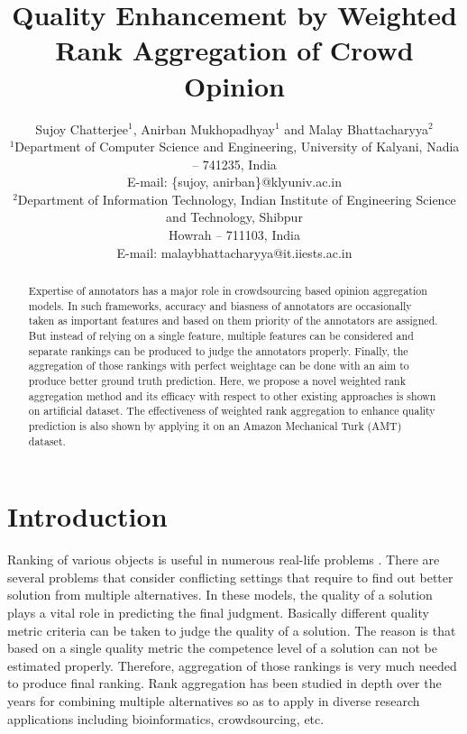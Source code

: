 \documentclass[letterpaper]{article}
\begin{document}
\title{Quality Enhancement by Weighted Rank Aggregation of Crowd Opinion}
\author{Sujoy Chatterjee$^1$, Anirban Mukhopadhyay$^1$ and Malay Bhattacharyya$^2$\\
$^1$Department of Computer Science and Engineering, University of Kalyani, Nadia -- 741235, India\\
E-mail: \{sujoy, anirban\}@klyuniv.ac.in\\
$^2$Department of Information Technology, Indian Institute of Engineering Science and Technology, Shibpur\\ Howrah -- 711103, India\\
E-mail: malaybhattacharyya@it.iiests.ac.in\\
}
\maketitle




\begin{abstract}
Expertise of annotators has a major role in crowdsourcing based opinion aggregation models. In such frameworks, accuracy and biasness of annotators are occasionally taken as important features and based on them priority of the annotators are assigned. But instead of relying on a single feature, multiple features can be considered and separate rankings can be produced to judge the annotators properly. Finally, the aggregation of those rankings with perfect weightage can be done with an aim to produce better ground truth prediction. Here, we propose a novel weighted rank aggregation method and its efficacy with respect to other existing approaches is shown on artificial dataset. The effectiveness of weighted rank aggregation to enhance quality prediction is also shown by applying it on an Amazon Mechanical Turk (AMT) dataset.
\end{abstract}




\section{Introduction}
Ranking of various objects is useful in numerous real-life problems \cite{Dwork2001,DeConde2006}. There are several problems that consider conflicting settings that require to find out better solution from multiple alternatives. In these models, the quality of a solution plays a vital role in predicting the final judgment. Basically different quality metric criteria can be taken to judge the quality of a solution. The reason is that based on a single quality metric the competence level of a solution can not be estimated properly. Therefore, aggregation of those rankings is very much needed to produce final ranking. Rank aggregation \cite{DeConde2006,Dwork2001,Stuart03,Kolde2012,Chen:2013:PRA:2433396.2433420} has been studied in depth over the years for combining multiple alternatives so as to apply in diverse research applications including bioinformatics, crowdsourcing, etc.
\end{document}
